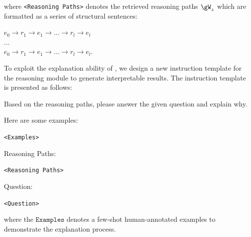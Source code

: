 where \texttt{<Reasoning Paths>} denotes the retrieved reasoning paths $\gW_z$ which are formatted as a series of structural sentences:

\begin{minipage}{0.99\columnwidth}
    \centering
    $e_0\to r_1\to e_1\to \dots \to r_l \to e_l$\\
    $\dots$\\
    $e_0\to r_1\to e_1\to \dots \to r_l \to e_l$.
\end{minipage}

To exploit the explanation ability of \ourmethod, we design a new instruction template for the reasoning module to generate interpretable results. The instruction template is presented as follows:

\begin{minipage}{0.99\columnwidth}
    \centering
    \begin{tcolorbox}[title=Explanation Prompt Template]
        \small
        Based on the reasoning paths, please answer the given question and explain why.

        \vspace{10pt}
        Here are some examples:

        \texttt{<Examples>}

        \vspace{10pt}
        Reasoning Paths:

        \texttt{<Reasoning Paths>}

        \vspace{10pt}
        Question:

        \texttt{<Question>}
    \end{tcolorbox}
\end{minipage}

where the $\texttt{Examples}$ denotes a few-shot human-annotated examples to demonstrate the explanation process.


